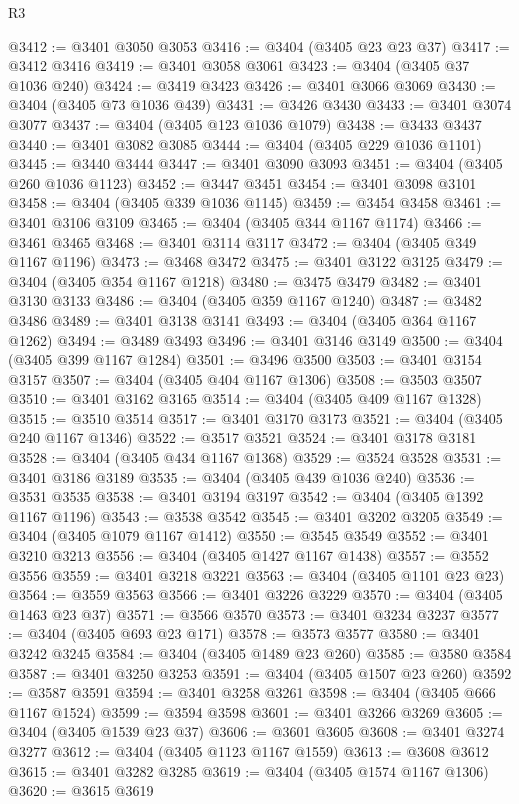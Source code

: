 \begin{lexlean}{R3}
\begin{coremodule}
@3412 := @3401 @3050 @3053
@3416 := @3404 (@3405 @23 @23 @37)
@3417 := @3412 @3416
@3419 := @3401 @3058 @3061
@3423 := @3404 (@3405 @37 @1036 @240)
@3424 := @3419 @3423
@3426 := @3401 @3066 @3069
@3430 := @3404 (@3405 @73 @1036 @439)
@3431 := @3426 @3430
@3433 := @3401 @3074 @3077
@3437 := @3404 (@3405 @123 @1036 @1079)
@3438 := @3433 @3437
@3440 := @3401 @3082 @3085
@3444 := @3404 (@3405 @229 @1036 @1101)
@3445 := @3440 @3444
@3447 := @3401 @3090 @3093
@3451 := @3404 (@3405 @260 @1036 @1123)
@3452 := @3447 @3451
@3454 := @3401 @3098 @3101
@3458 := @3404 (@3405 @339 @1036 @1145)
@3459 := @3454 @3458
@3461 := @3401 @3106 @3109
@3465 := @3404 (@3405 @344 @1167 @1174)
@3466 := @3461 @3465
@3468 := @3401 @3114 @3117
@3472 := @3404 (@3405 @349 @1167 @1196)
@3473 := @3468 @3472
@3475 := @3401 @3122 @3125
@3479 := @3404 (@3405 @354 @1167 @1218)
@3480 := @3475 @3479
@3482 := @3401 @3130 @3133
@3486 := @3404 (@3405 @359 @1167 @1240)
@3487 := @3482 @3486
@3489 := @3401 @3138 @3141
@3493 := @3404 (@3405 @364 @1167 @1262)
@3494 := @3489 @3493
@3496 := @3401 @3146 @3149
@3500 := @3404 (@3405 @399 @1167 @1284)
@3501 := @3496 @3500
@3503 := @3401 @3154 @3157
@3507 := @3404 (@3405 @404 @1167 @1306)
@3508 := @3503 @3507
@3510 := @3401 @3162 @3165
@3514 := @3404 (@3405 @409 @1167 @1328)
@3515 := @3510 @3514
@3517 := @3401 @3170 @3173
@3521 := @3404 (@3405 @240 @1167 @1346)
@3522 := @3517 @3521
@3524 := @3401 @3178 @3181
@3528 := @3404 (@3405 @434 @1167 @1368)
@3529 := @3524 @3528
@3531 := @3401 @3186 @3189
@3535 := @3404 (@3405 @439 @1036 @240)
@3536 := @3531 @3535
@3538 := @3401 @3194 @3197
@3542 := @3404 (@3405 @1392 @1167 @1196)
@3543 := @3538 @3542
@3545 := @3401 @3202 @3205
@3549 := @3404 (@3405 @1079 @1167 @1412)
@3550 := @3545 @3549
@3552 := @3401 @3210 @3213
@3556 := @3404 (@3405 @1427 @1167 @1438)
@3557 := @3552 @3556
@3559 := @3401 @3218 @3221
@3563 := @3404 (@3405 @1101 @23 @23)
@3564 := @3559 @3563
@3566 := @3401 @3226 @3229
@3570 := @3404 (@3405 @1463 @23 @37)
@3571 := @3566 @3570
@3573 := @3401 @3234 @3237
@3577 := @3404 (@3405 @693 @23 @171)
@3578 := @3573 @3577
@3580 := @3401 @3242 @3245
@3584 := @3404 (@3405 @1489 @23 @260)
@3585 := @3580 @3584
@3587 := @3401 @3250 @3253
@3591 := @3404 (@3405 @1507 @23 @260)
@3592 := @3587 @3591
@3594 := @3401 @3258 @3261
@3598 := @3404 (@3405 @666 @1167 @1524)
@3599 := @3594 @3598
@3601 := @3401 @3266 @3269
@3605 := @3404 (@3405 @1539 @23 @37)
@3606 := @3601 @3605
@3608 := @3401 @3274 @3277
@3612 := @3404 (@3405 @1123 @1167 @1559)
@3613 := @3608 @3612
@3615 := @3401 @3282 @3285
@3619 := @3404 (@3405 @1574 @1167 @1306)
@3620 := @3615 @3619

\end{coremodule}
\end{lexlean}
